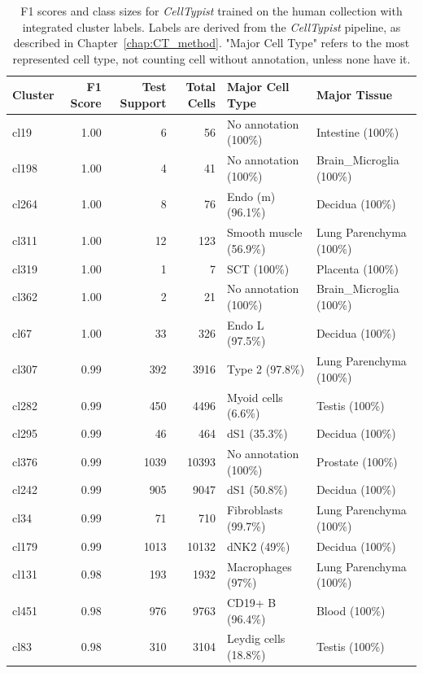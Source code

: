 \begin{table}[ht!]
\scriptsize
\caption[F1 scores and class sizes for \textit{CellTypist} trained on the human collection with integrated cluster labels]{F1 scores and class sizes for \textit{CellTypist} trained on the human collection with integrated cluster labels. Labels are derived from the \textit{CellTypist} pipeline, as described in Chapter~\ref{chap:CT_method}. "Major Cell Type" refers to the most represented cell type, not counting cell without annotation, unless none have it.}
\centering
\label{table:tab_HAmodelclust}
\begin{tabular}{lrrrll}
  \toprule
Cluster & F1 Score & Test Support & Total Cells & Major Cell Type & Major Tissue \\ 
  \midrule
cl19 & 1.00 &   6 &  56 & No annotation (100\%) & Intestine (100\%) \\ 
  cl198 & 1.00 &   4 &  41 & No annotation (100\%) & Brain\_Microglia (100\%) \\ 
  cl264 & 1.00 &   8 &  76 & Endo (m) (96.1\%) & Decidua (100\%) \\ 
  cl311 & 1.00 &  12 & 123 & Smooth muscle (56.9\%) & Lung Parenchyma (100\%) \\ 
  cl319 & 1.00 &   1 &   7 & SCT (100\%) & Placenta (100\%) \\ 
  cl362 & 1.00 &   2 &  21 & No annotation (100\%) & Brain\_Microglia (100\%) \\ 
  cl67 & 1.00 &  33 & 326 & Endo L (97.5\%) & Decidua (100\%) \\ 
  cl307 & 0.99 & 392 & 3916 & Type 2 (97.8\%) & Lung Parenchyma (100\%) \\ 
  cl282 & 0.99 & 450 & 4496 & Myoid cells (6.6\%) & Testis (100\%) \\ 
  cl295 & 0.99 &  46 & 464 & dS1 (35.3\%) & Decidua (100\%) \\ 
  cl376 & 0.99 & 1039 & 10393 & No annotation (100\%) & Prostate (100\%) \\ 
  cl242 & 0.99 & 905 & 9047 & dS1 (50.8\%) & Decidua (100\%) \\ 
  cl34 & 0.99 &  71 & 710 & Fibroblasts (99.7\%) & Lung Parenchyma (100\%) \\ 
  cl179 & 0.99 & 1013 & 10132 & dNK2 (49\%) & Decidua (100\%) \\ 
  cl131 & 0.98 & 193 & 1932 & Macrophages (97\%) & Lung Parenchyma (100\%) \\ 
  cl451 & 0.98 & 976 & 9763 & CD19+ B (96.4\%) & Blood (100\%) \\ 
  cl83 & 0.98 & 310 & 3104 & Leydig cells (18.8\%) & Testis (100\%) \\ 

\end{tabular}
\end{table}
